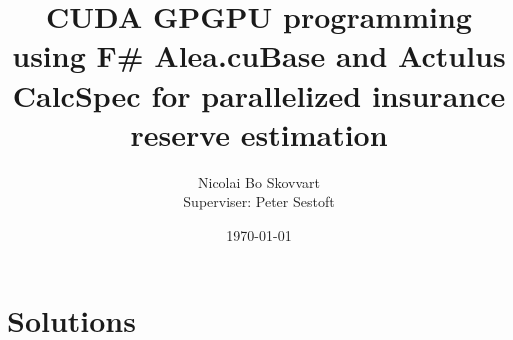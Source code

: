 \documentclass{llncs}
\title{CUDA GPGPU programming using F\# Alea.cuBase and Actulus CalcSpec for parallelized insurance reserve estimation}
\author{Nicolai Bo Skovvart \email{nbsk@itu.dk}\\Superviser: Peter Sestoft}
\date{\today}
\institute{IT University of Copenhagen}
\begin{document}
	
	
	\setcounter{page}{1}
	
	\maketitle

	

	\tableofcontents
	\listoffigures
	\listoftables

	\clearpage	

	
	

	\section{Solutions}
	
	
	

	
	
	
	
	
	
	
    \clearpage
	\appendix
	\addappheadtotoc
	
\end{document}
